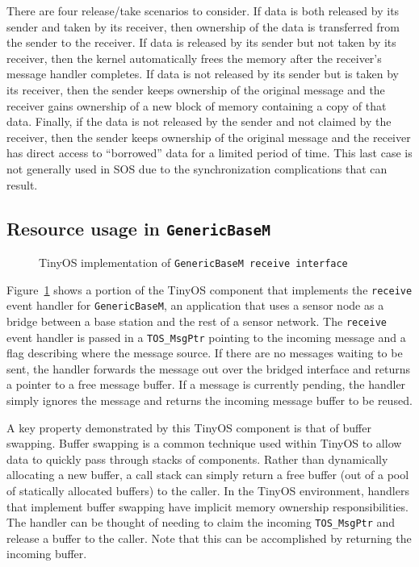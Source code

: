 There are four release/take scenarios to consider.  If data is both
released by its sender and taken by its receiver, then ownership of
the data is transferred from the sender to the receiver.  If data is
released by its sender but not taken by its receiver, then the kernel
automatically frees the memory after the receiver's message handler
completes.  If data is not released by its sender but is taken by its
receiver, then the sender keeps ownership of the original message and
the receiver gains ownership of a new block of memory containing a
copy of that data.  Finally, if the data is not released by the sender
and not claimed by the receiver, then the sender keeps ownership of
the original message and the receiver has direct access to
``borrowed'' data for a limited period of time.  This last case is not
generally used in SOS due to the synchronization complications that
can result.


\subsection{Resource usage in {\tt GenericBaseM}}

\begin{figure}[t]

\caption{TinyOS implementation of {\tt GenericBaseM receive
interface}\label{fig:genericbase}}
\end{figure}


Figure~\ref{fig:genericbase} shows a portion of the TinyOS component
that implements the {\tt receive} event handler for {\tt GenericBaseM},
an application that uses a sensor node as a bridge between a base
station and the rest of a sensor network.  The {\tt receive} event
handler is passed in a {\tt TOS\_MsgPtr} pointing to the incoming
message and a flag describing where the message source.  If there are
no messages waiting to be sent, the handler forwards the message out
over the bridged interface and returns a pointer to a free message
buffer.  If a message is currently pending, the handler simply ignores
the message and returns the incoming message buffer to be reused.

A key property demonstrated by this TinyOS component is that of buffer
swapping.  Buffer swapping 
is a common technique used within TinyOS to allow data
to quickly pass through stacks of components.  Rather than
dynamically allocating a new buffer, a call stack can simply return a
free buffer (out of a pool of statically allocated buffers)
to the caller.  In the TinyOS environment, handlers
that implement buffer swapping have implicit memory ownership
responsibilities.  The handler can be thought of needing to claim the
incoming {\tt TOS\_MsgPtr} and release a buffer to the caller.  Note
that this can be accomplished by returning the incoming buffer.


